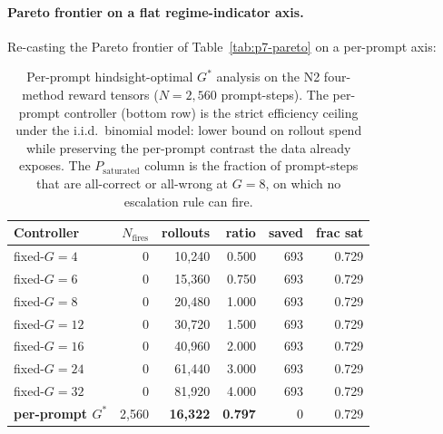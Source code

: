 \paragraph{Pareto frontier on a flat regime-indicator axis.}
Re-casting the Pareto frontier of Table~\ref{tab:p7-pareto} on a
per-prompt axis:

\begin{table}[t]
\centering
\caption{Per-prompt hindsight-optimal $G^*$ analysis on the N2
four-method reward tensors ($N = 2{,}560$ prompt-steps). The
per-prompt controller (bottom row) is the strict efficiency ceiling
under the i.i.d.\ binomial model: lower bound on rollout spend while
preserving the per-prompt contrast the data already exposes.  The
$P_\text{saturated}$ column is the fraction of prompt-steps that are
all-correct or all-wrong at $G=8$, on which no escalation rule can
fire.}
\label{tab:p7-per-prompt-optimal}
\begin{tabular}{lrrrrr}
\toprule
Controller & $N_\text{fires}$ & rollouts & ratio & saved & frac sat \\
\midrule
fixed-$G{=}4$  & 0  & 10{,}240 & 0.500 & 693 & 0.729 \\
fixed-$G{=}6$  & 0  & 15{,}360 & 0.750 & 693 & 0.729 \\
fixed-$G{=}8$  & 0  & 20{,}480 & 1.000 & 693 & 0.729 \\
fixed-$G{=}12$ & 0  & 30{,}720 & 1.500 & 693 & 0.729 \\
fixed-$G{=}16$ & 0  & 40{,}960 & 2.000 & 693 & 0.729 \\
fixed-$G{=}24$ & 0  & 61{,}440 & 3.000 & 693 & 0.729 \\
fixed-$G{=}32$ & 0  & 81{,}920 & 4.000 & 693 & 0.729 \\
\midrule
\textbf{per-prompt $G^*$} & 2{,}560 & \textbf{16{,}322} & \textbf{0.797} & 0 & 0.729 \\
\bottomrule
\end{tabular}
\end{table}

